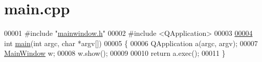 \hypertarget{a00108_source}{\section{main.\+cpp}
\label{a00108_source}
}

\begin{DoxyCode}
00001 \textcolor{preprocessor}{#include "\hyperlink{a00110}{mainwindow.h}"}
00002 \textcolor{preprocessor}{#include <QApplication>}
00003 
\hypertarget{a00108_source_l00004}{}\hyperlink{a00108_a0ddf1224851353fc92bfbff6f499fa97}{00004} \textcolor{keywordtype}{int} \hyperlink{a00108_a0ddf1224851353fc92bfbff6f499fa97}{main}(\textcolor{keywordtype}{int} argc, \textcolor{keywordtype}{char} *argv[])
00005 \{
00006     QApplication a(argc, argv);
00007      \hyperlink{a00017}{MainWindow} w;
00008     w.show();
00009 
00010     \textcolor{keywordflow}{return} a.exec();
00011 \}
\end{DoxyCode}
